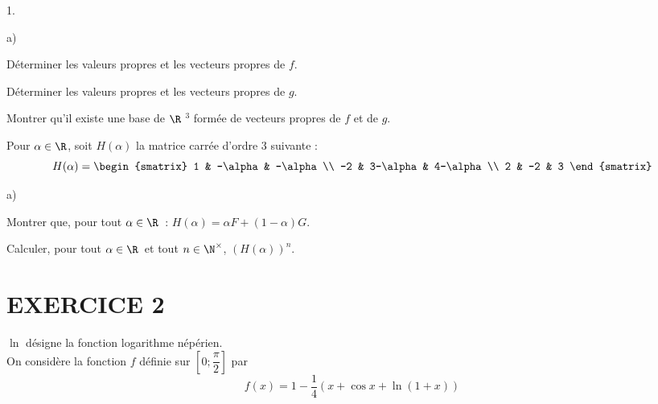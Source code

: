 \documentclass[11pt]{article}%
\begin{document}
\begin{noliste}{1.}
 \setlength{\itemsep}{4mm}
\item 

\begin{noliste}{a)}
 \setlength{\itemsep}{2mm}
\item Déterminer les valeurs propres et les vecteurs propres de $f$.

\item Déterminer les valeurs propres et les vecteurs propres de $g$.
\end{noliste}

\item Montrer qu'il existe une base de $\R$ $^{3}$ formée de
vecteurs propres de $f$ et de $g$.

\item Pour $\alpha \in \R$, soit $H(\alpha )$ la matrice carrée
d'ordre 3 suivante : 
\[
H(\alpha ) = 
\begin{smatrix}
1 & -\alpha & -\alpha \\
-2 & 3-\alpha & 4-\alpha \\
2 & -2 & 3
\end{smatrix}
\]

\begin{noliste}{a)}
 \setlength{\itemsep}{2mm}
\item Montrer que, pour tout $\alpha \in \R$\ : $H(\alpha ) = \alpha
F + (1-\alpha )G$.

\item Calculer, pour tout $\alpha \in \R$\ et tout $n\in \N^{\times }$,
$\left( H(\alpha )\right) ^{n}$.
\end{noliste}
\end{noliste}

\section*{EXERCICE 2}

$\ln $ désigne la fonction logarithme népérien.\\
On considère la fonction $f$ définie sur $\left[ 0;\dfrac{\pi
}{2}\right] $
par \ 
\[
f(x) = 1-\dfrac{1}{4}(x + \cos x + \ln (1 + x))
\]
\end{document}
